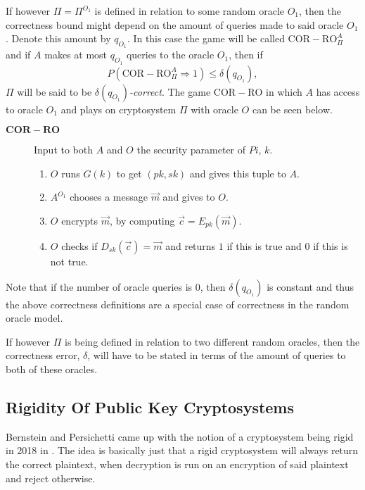 If however $\Pi = \Pi^{O_1}$ is defined in relation to some random oracle $O_1$, then the correctness bound might depend on the amount of queries made to said oracle $O_1$. Denote this amount by $q_{O_1}$. In this case the game will be called $\mathrm{COR-RO}^A_{\Pi}$ and if $A$ makes at most $q_{O_1}$ queries to the oracle $O_1$, then if
\[
	P\left( \mathrm{COR-RO}^A_{\Pi} \Rightarrow 1 \right) \leq \delta\left( q_{O_1} \right) ,
\]
$\Pi$ will be said to be \emph{$\delta\left( q_{O_1} \right)$-correct}. The game $\mathrm{COR-RO}$ in which $A$ has access to oracle $O_1$ and plays on cryptosystem $\Pi$ with oracle $O$ can be seen below.
\begin{description}
	\item[$\mathrm{\mathbf{COR-RO}}$] Input to both $A$ and $O$ the security parameter of $Pi$, $k$.
	\begin{enumerate}
		\item $O$ runs $G\left(k\right)$ to get $\left(pk,sk\right)$ and gives this tuple to $A$.
		\item $A^{O_1}$ chooses a message $\vec{m}$ and gives to $O$.
		\item $O$ encrypts $\vec{m}$, by computing $\vec{c} = E_{pk}\left(\vec{m}\right)$.
		\item $O$ checks if $D_{sk}\left(\vec{c}\right) = \vec{m}$ and returns $1$ if this is true and $0$ if this is not true.
	\end{enumerate}
\end{description}
Note that if the number of oracle queries is $0$, then $\delta\left( q_{O_1} \right)$ is constant and thus the above correctness definitions are a special case of correctness in the random oracle model.

If however $\Pi$ is being defined in relation to two different random oracles, then the correctness error, $\delta$, will have to be stated in terms of the amount of queries to both of these oracles.



\subsection{Rigidity Of Public Key Cryptosystems}
\label{subsec:rigOfPubKeyCry}

Bernstein and Persichetti came up with the notion of a cryptosystem being rigid in 2018 in \cite{BP2}. The idea is basically just that a rigid cryptosystem will always return the correct plaintext, when decryption is run on an encryption of said plaintext and reject otherwise.

